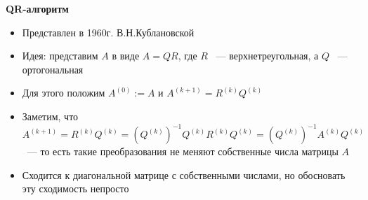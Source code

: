 \textbf{QR-алгоритм}
    \begin{itemize}
        \item Представлен в 1960г. В.Н.Кублановской
        \item Идея: представим \(A\) в виде \(A = QR\), где \(R\) ~--- верхнетреугольная, а \(Q\) ~--- ортогональная
        \item Для этого положим \(A^{(0)} := A\) и \(A^{(k+1)} = R^{(k)}Q^{(k)}\)
        \item Заметим, что \(A^{(k+1)} = R^{(k)}Q^{(k)} = (Q^{(k)})^{-1}Q^{(k)}R^{(k)}Q^{(k)} = (Q^{(k)})^{-1}A^{(k)}Q^{(k)}\) ~--- то есть такие преобразования не меняют собственные числа матрицы \(A\)
        \item Сходится к диагональной матрице с собственными числами, но обосновать эту сходимость непросто
    \end{itemize}
    